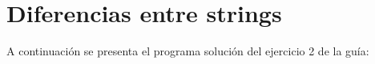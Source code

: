 \section{Diferencias entre strings}

  A continuación se presenta el programa solución
  del ejercicio 2 de la guía:
  
  